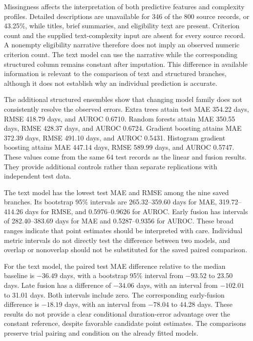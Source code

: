 \documentclass[10pt,letterpaper,twocolumn]{article}
\begin{document}
Missingness affects the interpretation of both predictive features and complexity profiles. Detailed descriptions are unavailable for 346 of the 800 source records, or 43.25\%, while titles, brief summaries, and eligibility text are present. Criterion count and the supplied text-complexity input are absent for every source record. A nonempty eligibility narrative therefore does not imply an observed numeric criterion count. The text model can use the narrative while the corresponding structured column remains constant after imputation. This difference in available information is relevant to the comparison of text and structured branches, although it does not establish why an individual prediction is accurate.

The additional structured ensembles show that changing model family does not consistently resolve the observed errors. Extra trees attain test MAE 354.22 days, RMSE 418.79 days, and AUROC 0.6710. Random forests attain MAE 350.55 days, RMSE 428.37 days, and AUROC 0.6724. Gradient boosting attains MAE 372.39 days, RMSE 491.10 days, and AUROC 0.5431. Histogram gradient boosting attains MAE 447.14 days, RMSE 589.99 days, and AUROC 0.5747. These values come from the same 64 test records as the linear and fusion results. They provide additional controls rather than separate replications with independent test data.

The text model has the lowest test MAE and RMSE among the nine saved branches. Its bootstrap 95\% intervals are 265.32--359.60 days for MAE, 319.72--414.26 days for RMSE, and 0.5976--0.9626 for AUROC. Early fusion has intervals of 282.40--383.69 days for MAE and 0.5287--0.9356 for AUROC. These broad ranges indicate that point estimates should be interpreted with care. Individual metric intervals do not directly test the difference between two models, and overlap or nonoverlap should not be substituted for the saved paired comparison.

For the text model, the paired test MAE difference relative to the median baseline is $-36.49$ days, with a bootstrap 95\% interval from $-93.52$ to 23.50 days. Late fusion has a difference of $-34.06$ days, with an interval from $-102.01$ to 31.01 days. Both intervals include zero. The corresponding early-fusion difference is $-18.19$ days, with an interval from $-78.04$ to 44.28 days. These results do not provide a clear conditional duration-error advantage over the constant reference, despite favorable candidate point estimates. The comparisons preserve trial pairing and condition on the already fitted models.
\end{document}
